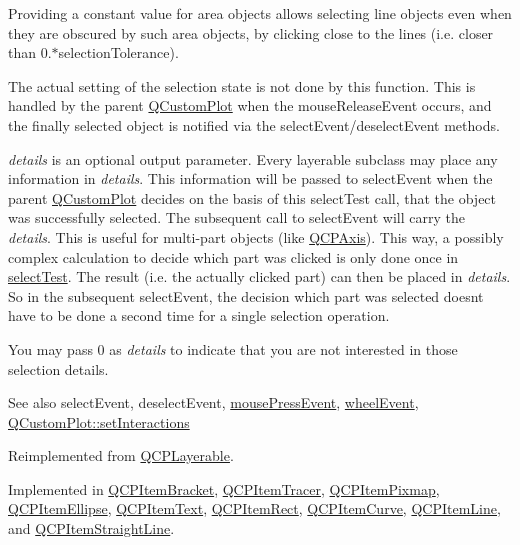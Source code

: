 Providing a constant value for area objects allows selecting line objects even when they are obscured by such area objects, by clicking close to the lines (i.\+e. closer than 0.$\ast$selection\+Tolerance).

The actual setting of the selection state is not done by this function. This is handled by the parent \hyperlink{class_q_custom_plot}{Q\+Custom\+Plot} when the mouse\+Release\+Event occurs, and the finally selected object is notified via the select\+Event/deselect\+Event methods.

{\itshape details} is an optional output parameter. Every layerable subclass may place any information in {\itshape details}. This information will be passed to select\+Event when the parent \hyperlink{class_q_custom_plot}{Q\+Custom\+Plot} decides on the basis of this select\+Test call, that the object was successfully selected. The subsequent call to select\+Event will carry the {\itshape details}. This is useful for multi-\/part objects (like \hyperlink{class_q_c_p_axis}{Q\+C\+P\+Axis}). This way, a possibly complex calculation to decide which part was clicked is only done once in \hyperlink{class_q_c_p_abstract_item_ae41d0349d68bb802c49104afd100ba2a}{select\+Test}. The result (i.\+e. the actually clicked part) can then be placed in {\itshape details}. So in the subsequent select\+Event, the decision which part was selected doesn\textquotesingle{}t have to be done a second time for a single selection operation.

You may pass 0 as {\itshape details} to indicate that you are not interested in those selection details.

\begin{DoxySeeAlso}{See also}
select\+Event, deselect\+Event, \hyperlink{class_q_c_p_layerable_af6567604818db90f4fd52822f8bc8376}{mouse\+Press\+Event}, \hyperlink{class_q_c_p_layerable_a47dfd7b8fd99c08ca54e09c362b6f022}{wheel\+Event}, \hyperlink{class_q_custom_plot_a5ee1e2f6ae27419deca53e75907c27e5}{Q\+Custom\+Plot\+::set\+Interactions} 
\end{DoxySeeAlso}


Reimplemented from \hyperlink{class_q_c_p_layerable_a04db8351fefd44cfdb77958e75c6288e}{Q\+C\+P\+Layerable}.



Implemented in \hyperlink{class_q_c_p_item_bracket_a49a6b2f41e0a8c2a2e3a2836027a8455}{Q\+C\+P\+Item\+Bracket}, \hyperlink{class_q_c_p_item_tracer_a9fd955fea40e977d66f3a9fd5765aec4}{Q\+C\+P\+Item\+Tracer}, \hyperlink{class_q_c_p_item_pixmap_a65d1ede7bb479b90d40186d083071947}{Q\+C\+P\+Item\+Pixmap}, \hyperlink{class_q_c_p_item_ellipse_ab6e2b8a29695c606c7731e498297ca29}{Q\+C\+P\+Item\+Ellipse}, \hyperlink{class_q_c_p_item_text_a676aaec10ad3cc4d7d0e4847db04c838}{Q\+C\+P\+Item\+Text}, \hyperlink{class_q_c_p_item_rect_a2e68621b75bae4da6ae0ab2cdd0dd733}{Q\+C\+P\+Item\+Rect}, \hyperlink{class_q_c_p_item_curve_a718fa40140a43c8afbd41a3d85c92d72}{Q\+C\+P\+Item\+Curve}, \hyperlink{class_q_c_p_item_line_a8e02bfbca04fbcf3dbc375a2bf693229}{Q\+C\+P\+Item\+Line}, and \hyperlink{class_q_c_p_item_straight_line_a2e36c9d4dcc3aeda78a5584f790e39e3}{Q\+C\+P\+Item\+Straight\+Line}.

